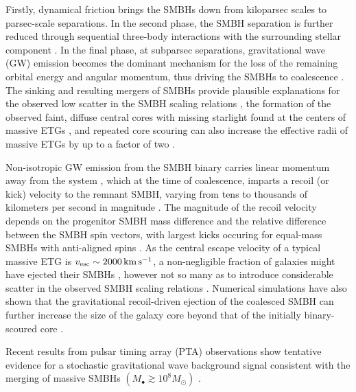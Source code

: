 \documentclass[twocolumn]{aastex631}
\newcommand{\kmps}{\ensuremath{\mathrm{km}\,\mathrm{s}^{-1}} }%
\begin{document}
Firstly, dynamical friction \citep{chandrasekhar1943} brings the SMBHs down from kiloparsec scales to parsec-scale separations. In the second phase, the SMBH separation is further reduced through sequential three-body interactions with the surrounding stellar component \citep{hills1980,quinlan1996}. 
In the final phase, at subparsec separations, gravitational wave (GW) emission becomes the dominant mechanism for the loss of the remaining orbital energy and angular momentum, thus driving the SMBHs to coalescence \citep{peters1963}. 
The sinking and resulting mergers of SMBHs provide plausible explanations for the observed low scatter in the SMBH scaling relations \citep[e.g.][]{hirschmann2010,jahnke2011}, the formation of the observed faint, diffuse central cores with missing starlight found at the centers of massive ETGs \citep[e.g.][]{milosavljevic2001,hoffman2007,rantala2018,nasim2021b}, and repeated core scouring can also increase the effective radii of massive ETGs by up to a factor of two \citep[e.g.][]{rantala2019,rantala2024}. 

Non-isotropic GW emission from the SMBH binary carries linear momentum away from the system \citep[e.g.][]{bekenstein1973,gonzalez2007}, which at the time of coalescence, imparts a recoil (or kick) velocity to the remnant SMBH, varying from tens to thousands of kilometers per second in magnitude \citep{campanelli2007,gonzalez2007b}.
The magnitude of the recoil velocity depends on the progenitor SMBH mass difference and the relative difference between the SMBH spin vectors, with largest kicks occuring for equal-mass SMBHs with anti-aligned spins \citep{gonzalez2007b}.
As the central escape velocity of a typical massive ETG is $v_{\rm esc}\sim 2000 \,\kmps$, a non-negligible fraction of galaxies might have ejected their SMBHs \citep[e.g.][]{madau2004,mannerkoski2022}, however not so many as to introduce considerable scatter in the observed SMBH scaling relations \citep{volonteri2007}. Numerical simulations have also shown that the gravitational recoil-driven ejection of the coalesced SMBH can further increase the size of the galaxy core beyond that of the initially binary-scoured core \citep[e.g.][]{gualandris2008,nasim2021b,khonji2024,rawlings2025}.

Recent results from pulsar timing array (PTA) observations show tentative evidence for a stochastic gravitational wave background signal consistent with the merging of massive SMBHs $(M_{\bullet}\gtrsim 10^{8} M_{\odot})$ \citep[]{agazie2023,2023Xu,zic2023,antoniadis2024}. 
\end{document}
